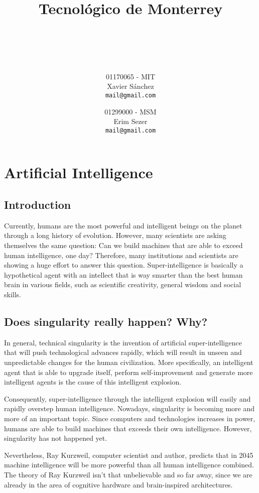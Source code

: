 \documentclass[titlepage, letterpaper, fleqn]{article}
\title{
  \vspace{1in}
  \textbf{Tecnológico de Monterrey} \\
  \vspace{0.5in}
  \textmd{\mahclass} \\
  \large{\textit{\mahteacher}} \\
  \vspace{0.5in}
  \textsc{\mahtitle}
  \author{01170065 - MIT \\
  Xavier Sánchez \\
  \texttt{mail@gmail.com}
  \and
  01299000 - MSM \\
  Erim Sezer \\
  \texttt{mail@gmail.com}
  }
  \date{\mahdate}
}
\begin{document}
\begin{titlepage}
\maketitle
\end{titlepage}

%
%

\section{Artificial Intelligence}
\subsection{Introduction}

Currently, humans are the most powerful and intelligent beings on the planet through a long history of evolution.
However, many scientists are asking themselves the same question: Can we build machines that are able to exceed human intelligence, one day?
Therefore, many institutions and scientists are showing a huge effort to answer this question.
Super-intelligence is basically a hypothetical agent with an intellect that is way smarter than the best human brain in various fields, such as scientific creativity, general wisdom and social skills.

\subsection{Does singularity really happen? Why?}
In general, technical singularity is the invention of artificial super-intelligence that will push technological advances rapidly, which will result in unseen and unpredictable changes for the human civilization.
More specifically, an intelligent agent that is able to upgrade itself, perform self-improvement and generate more intelligent agents is the cause of this intelligent explosion.

Consequently, super-intelligence through the intelligent explosion will easily and rapidly overstep human intelligence.
Nowadays, singularity is becoming more and more of an important topic. Since computers and technologies increases in power, humans are able to build machines that exceeds their own intelligence.
However, singularity has not happened yet.

Nevertheless, Ray Kurzweil, computer scientist and author, predicts that in 2045 machine intelligence will be more powerful than all human intelligence combined.
The theory of Ray Kurzweil isn't that unbelievable and so far away, since we are already in the area of cognitive hardware and brain-inspired architectures.
\end{document}
